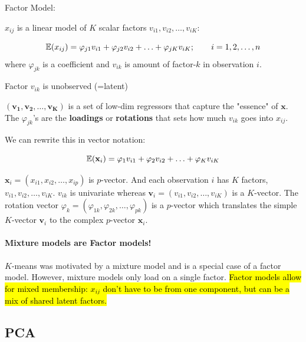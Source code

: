 \documentclass[11pt]{article}
\begin{document}
\begin{definition}
    Factor Model:

    $x_{ij}$ is a linear model of $K$ scalar factors $v_{i1}, v_{i2}, \ldots, v_{iK}$:

    \begin{equation*}
        \mathbb{E}(x_{ij}) = \varphi_{j1}v_{i1} + \varphi_{j2}v_{i2} + \ldots + \varphi_{jK}v_{iK}; \qquad i = 1,2,\ldots, n
    \end{equation*}
    where $\varphi_{jk}$ is a coefficient and $v_{ik}$ is amount of factor-$k$ in observation $i$.

    \begin{note}
        Factor $v_{ik}$ is unobserved (=latent)
    \end{note}

    $(\mathbf{v_1, v_2, \ldots, v_K})$ is a set of low-dim regressors that capture the "essence" of $\mathbf{x}$. The $\varphi_{jk}$'s are the \textbf{loadings} or \textbf{rotations} that sets how much $v_{ik}$ goes into $x_{ij}$.
\end{definition}


We can rewrite this in vector notation:

\begin{equation*}
    \mathbb{E}(\mathbf{x}_i) = \varphi_1 v_{i1} + \varphi_2 v_{i2} + \ldots + \varphi_K v_{iK}
\end{equation*}

\begin{note}
    $\mathbf{x}_i =  (x_{i1}, x_{i2}, \ldots, x_{ip})$ is $p$-vector. And each observation $i$ has $K$ factors, $v_{i1}, v_{i2}, \ldots, v_{iK}$. $v_{ik}$ is univariate whereas $\mathbf{v}_i = (v_{i1}, v_{i2}, \ldots, v_{iK})$ is a $K$-vector. The rotation vector $\varphi_k = (\varphi_{1k}, \varphi_{2k}, \ldots, \varphi_{pk})$ is a $p$-vector which translates the simple $K$-vector $\mathbf{v}_i$ to the complex $p$-vector $\mathbf{x}_i$.
\end{note}

\paragraph{Mixture models are Factor models!} $K$-means was motivated by a mixture model and is a special case of a factor model. However, mixture models only load on a single factor. \hl{Factor models allow for mixed membership: $x_{ij}$ don't have to be from one component, but can be a mix of shared latent factors.}


\subsection{PCA}
\label{sec:PCA}
\end{document}
